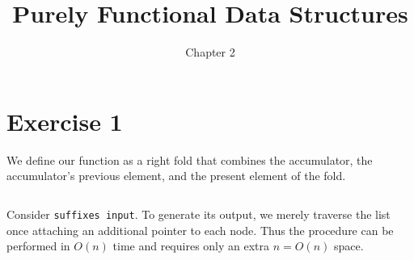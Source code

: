 \documentclass[nobib, letterpaper]{tufte-handout}
\date{} %
\title{Purely Functional Data Structures}
\author{Chapter 2}
\begin{document}
\maketitle

\section{Exercise 1}

We define our function as a right fold that combines the accumulator, the accumulator's previous element, and the present element of the fold.

\inputminted[bgcolor=LightGray,firstline=11, lastline=14]{haskell}{src/Lib.hs}

Consider \texttt{suffixes input}.
To generate its output, we merely traverse the list once attaching an additional pointer to each node. Thus the procedure can be performed in $O(n)$ time and requires only an extra $n=O(n)$ space.
\end{document}

